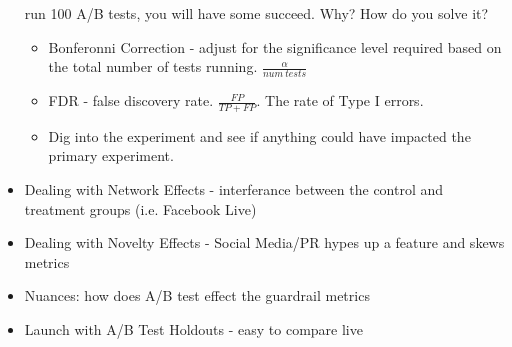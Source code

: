 \documentclass{article}
\begin{document}
\begin{multicols*}{2}
\begin{itemize}[noitemsep]
        run 100 A/B tests, you will have some succeed. Why? 
        How do you solve it?
        \begin{itemize}
            \item Bonferonni Correction - adjust for the 
            significance level required based on the total 
            number of tests running. $\frac{\alpha}{num \: tests}$
            \item FDR - false discovery rate. $\frac{FP}{TP+FP}$. 
            The rate of Type I errors.
            \item Dig into the experiment and see if anything 
            could have impacted the primary experiment.
        \end{itemize}
        \item Dealing with Network Effects - interferance between the 
        control and treatment groups (i.e. Facebook Live)
        \item Dealing with Novelty Effects - Social Media/PR 
        hypes up a feature and skews metrics
        \item Nuances: how does A/B test effect the guardrail metrics
        \item Launch with A/B Test Holdouts - easy to compare live
    \end{itemize}
\end{multicols*}
\end{document}
